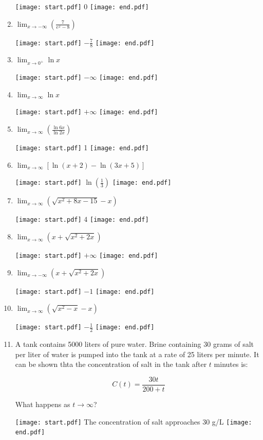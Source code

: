 \documentclass[12pt]{article}
\begin{document}
\begin{enumerate}
\texttt{[image: start.pdf]}
{{0}}
\texttt{[image: end.pdf]}


\item $\displaystyle \lim_{x \rightarrow -\infty}{\left(\frac{7}{e^x-8}\right)}$

\texttt{[image: start.pdf]}
{{$\displaystyle -\frac{7}{8}$}}
\texttt{[image: end.pdf]}


\item $\displaystyle \lim_{x\rightarrow 0^+}{\ln{x}}$ 

\texttt{[image: start.pdf]}
{{$-\infty$}}
\texttt{[image: end.pdf]}


\item  $\displaystyle \lim_{x\rightarrow \infty}{\ln{x}}$ 

\texttt{[image: start.pdf]}
{{$+\infty$}}
\texttt{[image: end.pdf]}


\item $\displaystyle \lim_{x\rightarrow \infty}{\left(\frac{\ln{6x}}{\ln{2x}}\right)}$

\texttt{[image: start.pdf]}
{{1}}
\texttt{[image: end.pdf]}


\item $\displaystyle \lim_{x\rightarrow \infty}{\left[\ln{(x+2)}-\ln{(3x+5)}\right]}$

\texttt{[image: start.pdf]}
{{$\displaystyle \ln{\left(\frac{1}{3}\right)}$}}
\texttt{[image: end.pdf]}


\item $\displaystyle \lim_{x \rightarrow \infty}{\left(\sqrt{x^2+8x-15}-x\right)}$

\texttt{[image: start.pdf]}
{{$4$}}
\texttt{[image: end.pdf]}


\item $\displaystyle \lim_{x \rightarrow \infty}{\left(x+\sqrt{x^2+2x}\right)}$

\texttt{[image: start.pdf]}
{{$+\infty$}}
\texttt{[image: end.pdf]}


\item $\displaystyle \lim_{x \rightarrow -\infty}{\left(x+\sqrt{x^2+2x}\right)}$

\texttt{[image: start.pdf]}
{{$-1$}}
\texttt{[image: end.pdf]}


\item  $\displaystyle \lim_{x\rightarrow \infty}{\left(\sqrt{x^2-x}-x\right)}$

\texttt{[image: start.pdf]}
{{$\displaystyle -\frac{1}{2}$}}
\texttt{[image: end.pdf]}


\item A tank contains 5000 liters of pure water.  Brine containing 30 grams of salt per liter of water is pumped into the tank at a rate of 25 liters per minute.  It can be shown thta the concentration of salt in the tank after $t$ minutes is:

$$C(t)=\frac{30t}{200+t}$$

What happens as $t \rightarrow \infty$?

\texttt{[image: start.pdf]}
{{The concentration of salt approaches $30$ g/L}}
\texttt{[image: end.pdf]}


\end{enumerate}
\end{document}
